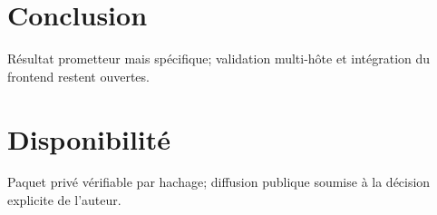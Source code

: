 \documentclass[11pt]{article}
\begin{document}
\section{Conclusion} Résultat prometteur mais spécifique; validation multi-hôte et intégration du frontend restent ouvertes.
\section*{Disponibilité} Paquet privé vérifiable par hachage; diffusion publique soumise à la décision explicite de l'auteur.

\end{document}
